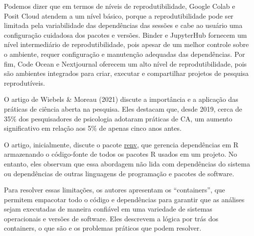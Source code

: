 \documentclass[
  a4paper,
]{book}
\begin{document}
Podemos dizer que em termos de níveis de reprodutibilidade, Google Colab
e Posit Cloud atendem a um nível básico, porque a reprodutibilidade pode
ser limitada pela variabilidade das dependências das sessões e cabe ao
usuário uma configuração cuidadosa dos pacotes e versões. Binder e
JupyterHub fornecem um nível intermediário de reprodutibilidade, pois
apesar de um melhor controle sobre o ambiente, requer configuração e
manutenção adequadas das dependências. Por fim, Code Ocean e Nextjournal
oferecem um alto nível de reprodutibilidade, pois são ambientes
integrados para criar, executar e compartilhar projetos de pesquisa
reprodutíveis.

\begin{tcolorbox}[enhanced jigsaw, leftrule=.75mm, colframe=quarto-callout-note-color-frame, left=2mm, toprule=.15mm, titlerule=0mm, bottomrule=.15mm, toptitle=1mm, opacityback=0, coltitle=black, colback=white, breakable, title=\textcolor{quarto-callout-note-color}{\faInfo}\hspace{0.5em}{\emph{Leveraging Containers for Reproducible Psychological Research}
(Tip~\ref{tip-prompt})}, opacitybacktitle=0.6, arc=.35mm, bottomtitle=1mm, rightrule=.15mm, colbacktitle=quarto-callout-note-color!10!white]

O artigo de Wiebels \& Moreau (2021) discute a importância e a aplicação
das práticas de ciência aberta na pesquisa. Eles destacam que, desde
2019, cerca de 35\% dos pesquisadores de psicologia adotaram práticas de
CA, um aumento significativo em relação aos 5\% de apenas cinco anos
antes.\vspace{0.5em}

O artigo, inicialmente, discute o pacote
\href{https://rstudio.github.io/renv/articles/renv.html}{renv}, que
gerencia dependências em R armazenando o código-fonte de todos os
pacotes R usados em um projeto. No entanto, eles observam que essa
abordagem não lida com dependências do sistema ou dependências de outras
linguagens de programação e pacotes de software.\vspace{0.5em}

Para resolver essas limitações, os autores apresentam os ``containers'',
que permitem empacotar todo o código e dependências para garantir que as
análises sejam executadas de maneira confiável em uma variedade de
sistemas operacionais e versões de software. Eles descrevem a lógica por
trás dos containers, o que são e os problemas práticos que podem
resolver.\vspace{0.5em}


\end{tcolorbox}
\end{document}
